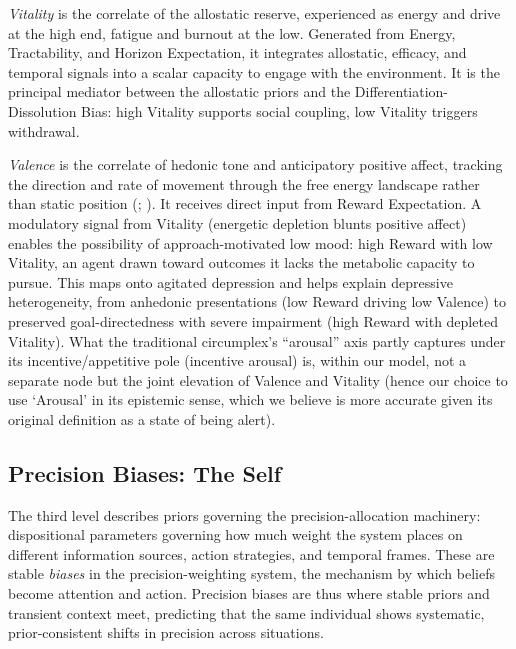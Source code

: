 \documentclass[
  jou,
  floatsintext,
  longtable,
  nolmodern,
  notxfonts,
  notimes,
  12pt,
  colorlinks=true,linkcolor=blue,citecolor=blue,urlcolor=blue]{apa7}
\begin{document}
\emph{Vitality} is the correlate of the allostatic reserve, experienced
as energy and drive at the high end, fatigue and burnout at the low.
Generated from Energy, Tractability, and Horizon Expectation, it
integrates allostatic, efficacy, and temporal signals into a scalar
capacity to engage with the environment. It is the principal mediator
between the allostatic priors and the Differentiation-Dissolution Bias:
high Vitality supports social coupling, low Vitality triggers
withdrawal.

\emph{Valence} is the correlate of hedonic tone and anticipatory
positive affect, tracking the direction and rate of movement through the
free energy landscape rather than static position
(;
). It
receives direct input from Reward Expectation. A modulatory signal from
Vitality (energetic depletion blunts positive affect) enables the
possibility of approach-motivated low mood: high Reward with low
Vitality, an agent drawn toward outcomes it lacks the metabolic capacity
to pursue. This maps onto agitated depression and helps explain
depressive heterogeneity, from anhedonic presentations (low Reward
driving low Valence) to preserved goal-directedness with severe
impairment (high Reward with depleted Vitality). What the traditional
circumplex's ``arousal'' axis partly captures under its
incentive/appetitive pole (incentive arousal) is, within our model, not
a separate node but the joint elevation of Valence and Vitality (hence
our choice to use `Arousal' in its epistemic sense, which we believe is
more accurate given its original definition as a state of being alert).

\subsection{Precision Biases: The Self}\label{precision-biases-the-self}

The third level describes priors governing the precision-allocation
machinery: dispositional parameters governing how much weight the system
places on different information sources, action strategies, and temporal
frames. These are stable \emph{biases} in the precision-weighting
system, the mechanism by which beliefs become attention and action.
Precision biases are thus where stable priors and transient context
meet, predicting that the same individual shows systematic,
prior-consistent shifts in precision across situations.
\end{document}
